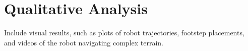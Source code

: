\section{Qualitative Analysis}

\begin{outline}
  Include visual results, such as plots of robot trajectories,
  footstep placements, and videos of the robot navigating complex terrain.
\end{outline}
